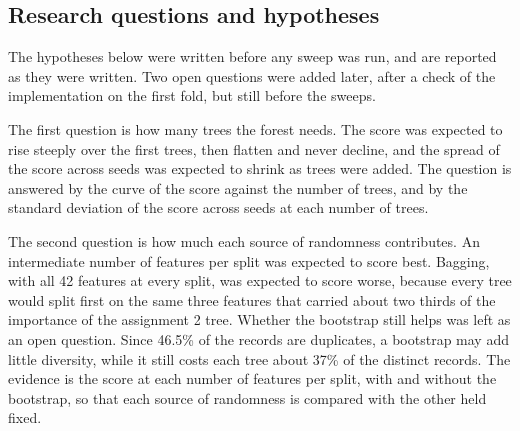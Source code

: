 \documentclass[conference,10pt]{IEEEtran}
\begin{document}
\subsection{Research questions and hypotheses}
\label{subsec:emp_questions}

The hypotheses below were written before any sweep was run, and are
reported as they were written. Two open questions were added later, after a
check of the implementation on the first fold, but still before the sweeps.


The first question is how many trees the forest needs. The score was
expected to rise steeply over the first trees, then flatten and never
decline, and the spread of the score across seeds was expected to shrink as trees were
added. The question is answered by the curve of the score against the number
of trees, and by the standard deviation of the score across seeds at each
number of trees.

The second question is how much each source of randomness contributes. An
intermediate number of features per split was expected to score best.
Bagging, with all 42 features at every split, was expected to score worse,
because every tree would split first on the same three features that
carried about two thirds of the importance of the assignment 2 tree.
Whether the bootstrap still helps was left as an open question. Since
46.5\% of the records are duplicates, a bootstrap may add little diversity,
while it still costs each tree about 37\% of the distinct records. The
evidence is the score at each number of features per split, with and without
the bootstrap, so that each source of randomness is compared with the other
held fixed.
\end{document}
